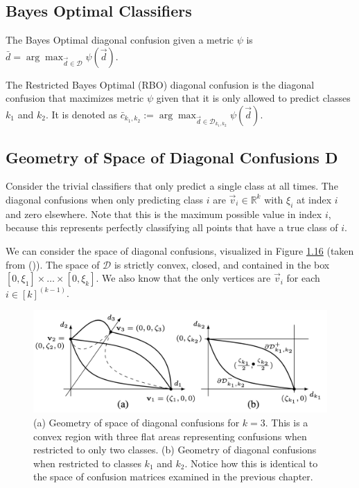 \documentclass[
  letterpaper,
  DIV=11,
  numbers=noendperiod,
  oneside]{scrreprt}
\theoremstyle{remark}
\begin{document}
\subsection{Bayes Optimal Classifiers}\label{bayes-optimal-classifiers}

The Bayes Optimal diagonal confusion given a metric \(\psi\) is
\(\bar{d} = \arg\max_{\vec{d} \in \mathcal{D}} \psi(\vec{d})\).

The Restricted Bayes Optimal (RBO) diagonal confusion is the diagonal
confusion that maximizes metric \(\psi\) given that it is only allowed
to predict classes \(k_1\) and \(k_2\). It is denoted as
\(\bar{c}_{k_1, k_2} := \arg\max_{\vec{d} \in \mathcal{D}_{k_1, k_2}} \psi(\vec{d})\).

\subsection{Geometry of Space of Diagonal Confusions
D}\label{geometry-of-space-of-diagonal-confusions-d}

Consider the trivial classifiers that only predict a single class at all
times. The diagonal confusions when only predicting class \(i\) are
\(\vec{v}_i \in \mathbb{R}^k\) with \(\xi_i\) at index \(i\) and zero
elsewhere. Note that this is the maximum possible value in index \(i\),
because this represents perfectly classifying all points that have a
true class of \(i\).

We can consider the space of diagonal confusions, visualized in Figure
\hyperref[diag_geom]{1.16} (taken from
()). The
space of \(\mathcal{D}\) is strictly convex, closed, and contained in
the box \([0, \xi_1] \times \dots \times [0, \xi_k]\). We also know that
the only vertices are \(\vec{v}_i\) for each \(i \in [k]^{(k-1)}\).

\begin{figure}

{\centering \includegraphics{src/Figures/diag_geometry.png}

}

\caption{(a) Geometry of space of diagonal confusions for \(k=3\). This
is a convex region with three flat areas representing confusions when
restricted to only two classes. (b) Geometry of diagonal confusions when
restricted to classes \(k_1\) and \(k_2\). Notice how this is identical
to the space of confusion matrices examined in the previous chapter.}

\end{figure}%
\end{document}
